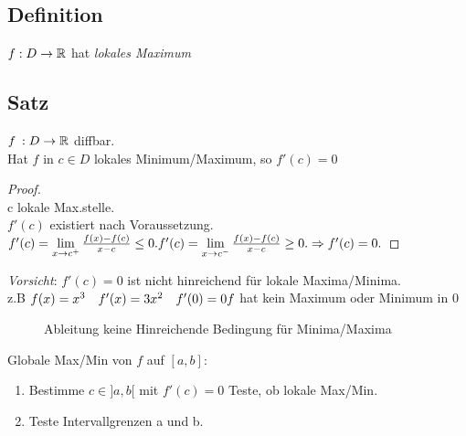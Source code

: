 \subsection{Definition}
$f : D \to \mathbb{R} $ hat \emph{lokales Maximum}
	\subsection[Satz:]{Satz}\label{sec:6.18}
	$f\: : D \to \mathbb{R} $ diffbar.\\
	Hat $f$ in $c \in D$ lokales Minimum/Maximum, so $f'(c) =0$
	\begin{proof}
		\ \\
		c lokale Max.stelle.\\
		$f'(c)$ existiert nach Voraussetzung.\\
		$ f'(c) = \lim\limits_{x \to c^+} \frac{f(x) - f(c)}{x-c}\le 0.\\
		f'(c) = \lim\limits_{x \to c^-} \frac{f(x) - f(c)}{x-c}\ge 0.\\
		\Rightarrow f'(c) = 0.$
	\end{proof}
	\emph{Vorsicht}: $f'(c) = 0$ ist nicht hinreichend für lokale Maxima/Minima.\\
	z.B $f(x) = x^3 \quad f'(x) = 3x^2\quad f'(0) = 0\\
	f$ hat kein Maximum oder Minimum in 0\\
	\begin{figure}[h!]
		\centering
		\caption{Ableitung keine Hinreichende Bedingung für Minima/Maxima}
	\end{figure}
	Globale Max/Min von $f$ auf $[a,b]$:
	\begin{enumerate}[-]
		\item Bestimme $c \in ]a,b[$ mit $f'(c) = 0$ Teste, ob lokale Max/Min.
		\item Teste Intervallgrenzen a und b.
	\end{enumerate}
